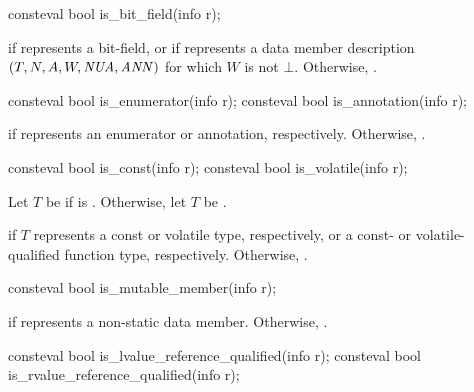 %
\begin{itemdecl}
consteval bool is_bit_field(info r);
\end{itemdecl}

\begin{itemdescr}
\pnum
\returns
{} if  represents a bit-field,
or if  represents a data member description
$(T, N, A, W, \mathit{NUA},\brk{} \mathit{ANN})$
for which $W$ is not $\bot$.
Otherwise, .
\end{itemdescr}

%
%
\begin{itemdecl}
consteval bool is_enumerator(info r);
consteval bool is_annotation(info r);
\end{itemdecl}

\begin{itemdescr}
\pnum
\returns
{} if  represents an enumerator or annotation, respectively.
Otherwise, .
\end{itemdescr}

%
%
\begin{itemdecl}
consteval bool is_const(info r);
consteval bool is_volatile(info r);
\end{itemdecl}

\begin{itemdescr}
\pnum
Let $T$ be  if  is .
Otherwise, let $T$ be .

\pnum
\returns
{} if $T$ represents a const or volatile type, respectively,
or a const- or volatile-qualified function type, respectively.
Otherwise, .
\end{itemdescr}

%
\begin{itemdecl}
consteval bool is_mutable_member(info r);
\end{itemdecl}

\begin{itemdescr}
\pnum
\returns
{} if  represents a  non-static data member.
Otherwise, .
\end{itemdescr}

%
%
\begin{itemdecl}
consteval bool is_lvalue_reference_qualified(info r);
consteval bool is_rvalue_reference_qualified(info r);
\end{itemdecl}

